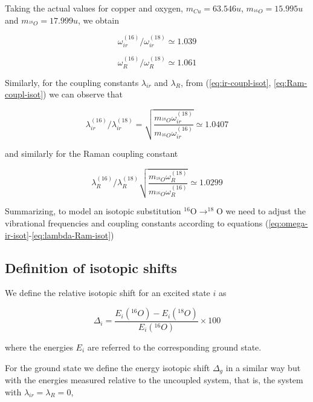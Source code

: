 Taking the actual values for copper and oxygen, $m_{Cu}=63.546u$, $m_{^{16}O}=15.995u$ and $m_{^{18}O}=17.999u$, we obtain

\begin{equation}
  \label{eq:omega-ir-isot}
  \omega^{(16)}_{ir} / \omega^{(18)}_{ir} \simeq 1.039
\end{equation}

\begin{equation}
  \label{eq:omega-R-isot}
  \omega^{(16)}_{R} / \omega^{(18)}_{R} \simeq 1.061
\end{equation}

Similarly, for the coupling constants $\lambda_{ir}$ and $\lambda_R$, from (\ref{eq:ir-coupl-isot}, \ref{eq:Ram-coupl-isot}) we can observe that

\begin{equation}
  \label{eq:lambda-ir-isot}
  \lambda_{ir}^{(16)}/\lambda_{ir}^{(18)}=\sqrt{\frac{m_{^{18}O}\omega_{ir}^{(18)}}{m_{^{16}O}\omega_{ir}^{(16)}}}\simeq 1.0407
\end{equation}

\noindent and similarly for the Raman coupling constant

\begin{equation}
  \label{eq:lambda-Ram-isot}
  \lambda_R^{(16)} / \lambda_R^{(18)} \sqrt{\frac{m_{^{18}O}\omega_{R}^{(18)}}{m_{^{16}O}\omega_{R}^{(16)}}} \simeq 1.0299
\end{equation}

Summarizing, to model an isotopic substitution $^{16}$O$\rightarrow ^{18}$O we need to adjust the vibrational frequencies and coupling constants according to equations (\ref{eq:omega-ir-isot}-\ref{eq:lambda-Ram-isot})

\subsection{Definition of isotopic shifts}


We define the relative isotopic shift for an excited state $i$ as 

\begin{equation}
  \label{eq:isot-shift-def-exc}
  \Delta_i = \frac{E_i(^{16}O)- E_i(^{18}O)}{E_i(^{16}O)} \times 100
\end{equation}

\noindent where the energies $E_i$ are referred to the corresponding ground state.

For the ground state we define the energy isotopic shift $\Delta_g$ in a similar way but with the energies measured relative to the uncoupled system, that is, the system with $\lambda_{ir}=\lambda_R=0$,

